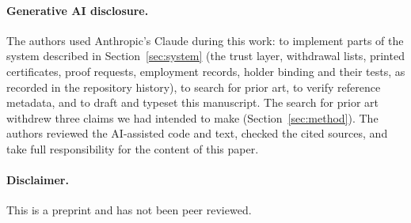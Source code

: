 \documentclass[10pt,a4paper,twocolumn]{article}
\begin{document}
\paragraph{Generative AI disclosure.} The authors used Anthropic's Claude during
this work: to implement parts of the system described in Section~\ref{sec:system}
(the trust layer, withdrawal lists, printed certificates, proof requests,
employment records, holder binding and their tests, as recorded in the repository
history), to search for prior art, to verify reference metadata, and to draft and
typeset this manuscript. The search for prior art withdrew three claims we had intended to make
(Section~\ref{sec:method}). The authors reviewed the AI-assisted
code and text, checked the cited sources, and take full responsibility for the
content of this paper.

\paragraph{Disclaimer.} This is a preprint and has not been peer reviewed.



\end{document}
